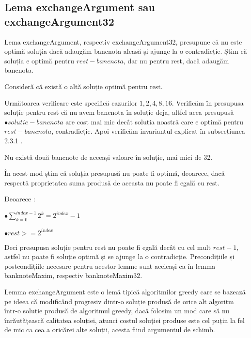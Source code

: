    \subsection{Lema exchangeArgument sau exchangeArgument32}
    Lema exchangeArgument, respectiv exchangeArgument32, presupune că nu este optimă soluția dacă adaugăm bancnota aleasă și ajunge la o contradicție.
    Știm că soluția e optimă pentru $rest - bancnota$, dar nu pentru rest, dacă adaugăm bancnota.\par
    Consideră că există o altă soluție optimă pentru rest.\par
    Următoarea verificare este specifică cazurilor $1,2,4,8,16$.
    Verificăm în presupusa soluție pentru rest că nu avem bancnota în soluție deja, altfel acea presupusă 
    $\bullet solutie - bancnota$ are cost mai mic decât soluția noastră care e optimă pentru $rest - bancnota$, contradicție.
    Apoi verificăm invariantul explicat în subsecțiunea 2.3.1 .\par
    Nu există două bancnote de aceeași valoare în soluție, mai mici de 32.\par
    În acest mod știm că soluția presupusă nu poate fi optimă, deoarece, dacă respectă proprietatea
    suma produsă de aceasta nu poate fi egală cu rest. \par
    Deoarece :\par
    $\bullet \sum_{k=0}^{index-1} 2^{k} = 2^{index}-1 $\par
    $\bullet rest > = 2^{index} $ \par
    Deci presupusa soluție pentru rest nu poate fi egală decât cu cel mult $rest-1$, astfel nu poate fi soluție optimă și se ajunge la o contradicție. 
    Precondițiile și postcondițiile necesare pentru acestor lemme sunt aceleași ca în lemma banknoteMaxim, respectiv banknoteMaxim32.\par
    Lemma exchangeArgument este o lemă tipică algoritmilor greedy care se bazează pe ideea că modificând progresiv 
    dintr-o soluție produsă de orice alt algoritm într-o soluție produsă de algoritmul greedy, dacă folosim un mod 
    care să nu înrăutățească calitatea soluției, atunci costul soluției produse este cel puțin la fel de mic ca 
    cea a oricărei alte soluții, acesta fiind argumentul de schimb.\par
